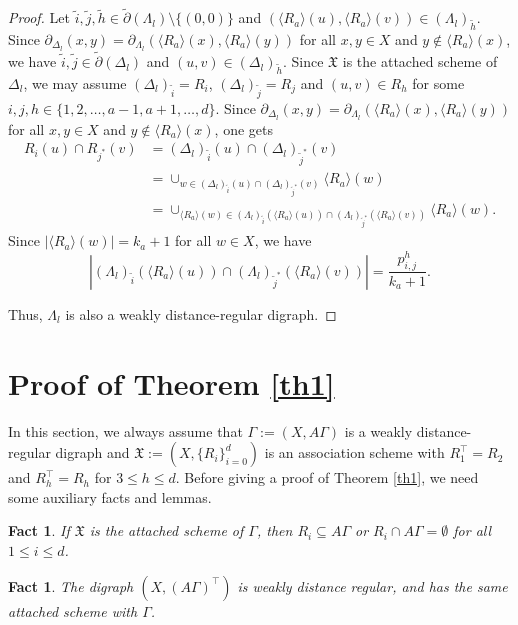 \documentclass[12pt,a4paper]{amsart}
\newtheorem{fact}[thm]{Fact}
\theoremstyle{definition}
\begin{document}
\begin{proof}
Let $\tilde{i},\tilde{j},\tilde{h}\in\tilde{\partial}(\Lambda_l)\setminus\{(0,0)\}$ and $(\langle R_a\rangle(u),\langle R_a\rangle(v))\in(\Lambda_l)_{\tilde{h}}$. Since $\partial_{\Delta_l}(x,y)=\partial_{\Lambda_l}(\langle R_a\rangle(x),\langle R_a\rangle(y))$ for all $x,y\in X$ and $y\notin \langle R_a\rangle(x)$, we have $\tilde{i},\tilde{j}\in\tilde{\partial}(\Delta_l)$ and $(u,v)\in(\Delta_l)_{\tilde{h}}$. Since $\mathfrak{X}$ is the attached scheme of $\Delta_l$, we may assume $(\Delta_{l})_{\tilde{i}}=R_i$, $(\Delta_{l})_{\tilde{j}}=R_j$ and $(u,v)\in R_h$ for some  $i,j,h\in\{1,2,\ldots,a-1,a+1,\ldots,d\}$. Since $\partial_{\Delta_l}(x,y)=\partial_{\Lambda_l}(\langle R_a\rangle(x),\langle R_a\rangle(y))$ for all $x,y\in X$ and $y\notin \langle R_a\rangle(x)$, one gets
\begin{align}
R_i(u)\cap R_{j^*}(v)&=(\Delta_l)_{{\tilde{i}}}(u)\cap (\Delta_l)_{\tilde{j}^*}(v)\nonumber\\
    &=\cup_{w\in (\Delta_l)_{{\tilde{i}}}(u)\cap (\Delta_l)_{\tilde{j}^*}(v)}\langle R_a\rangle(w)\nonumber\\
	&=\cup_{\langle R_a\rangle(w)\in(\Lambda_l)_{\tilde{i}}(\langle R_a\rangle(u))\cap(\Lambda_l)_{\tilde{j}^*}(\langle R_a\rangle(v))}\langle R_a\rangle(w).\nonumber
\end{align}
Since $|\langle R_a\rangle(w)|=k_{a}+1$ for all $w\in X$, we have $$|(\Lambda_l)_{\tilde{i}}(\langle R_a\rangle(u))\cap(\Lambda_l)_{\tilde{j}^*}(\langle R_a\rangle(v))|=\frac{p_{i,j}^{h}}{k_{a}+1}.$$

Thus,  $\Lambda_l$ is also a weakly distance-regular digraph.
\end{proof}

\section{Proof of Theorem \ref{th1}}
In this section, we always assume that $\Gamma:=(X,A\Gamma)$ is a weakly distance-regular digraph and $\mathfrak{X}:=(X,\{R_i\}_{i=0}^d)$ is an association scheme with $R_1^{\top}=R_2$ and $R_{h}^{\top}=R_{h}$ for $3\leq h\leq d$. Before giving a proof of Theorem \ref{th1}, we need some auxiliary facts and lemmas.

\begin{fact}\label{sub}
If $\mathfrak{X}$ is the attached scheme of $\Gamma$, then $R_{i}\subseteq A\Gamma$ or $R_{i}\cap A\Gamma=\emptyset$ for all $1\leq i\leq d$.
\end{fact}

\begin{fact}\label{fac2}
The digraph $(X,(A\Gamma)^{\top})$ is weakly distance regular, and has the same attached scheme with $\Gamma$.
\end{fact}
\end{document}
